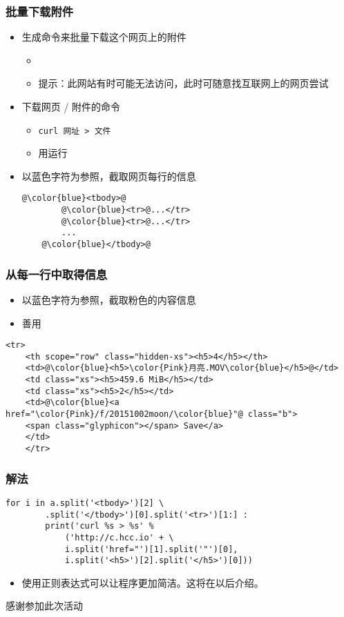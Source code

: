 \begin{frame} [fragile]
	\frametitle{批量下载附件}
	\begin{itemize}
	\item 生成命令来批量下载这个网页上的附件
		\begin{itemize}
		\item {}
		\item 提示：此网站有时可能无法访问，此时可随意找互联网上的网页尝试
		\end{itemize}
	\item 下载网页 / 附件的命令
		\begin{itemize}
		\item \texttt{curl 网址 > 文件}
		\item 用运行
		\end{itemize}
	\item 以{\color{blue}蓝色}字符为参照，截取网页每行的信息
	\begin{lstlisting}[style=pythonstyle, gobble=4, texcl, escapechar=@]
	@\color{blue}<tbody>@
		@\color{blue}<tr>@...</tr>
		@\color{blue}<tr>@...</tr>
		...
	@\color{blue}</tbody>@
	\end{lstlisting}
	\end{itemize}
\end{frame}

\begin{frame} [fragile]
	\frametitle{从每一行中取得信息}
	\begin{itemize}
	\item 以{\color{blue}蓝色}字符为参照，截取{\color{Pink}粉色}的内容信息
	\item 善用 
	\end{itemize}
	\begin{lstlisting}[basicstyle=\ttfamily, gobble=4, texcl, escapechar=@]
	<tr>
	<th scope="row" class="hidden-xs"><h5>4</h5></th>
	<td>@\color{blue}<h5>\color{Pink}月亮.MOV\color{blue}</h5>@</td>
	<td class="xs"><h5>459.6 MiB</h5></td>
	<td class="xs"><h5>2</h5></td>
	<td>@\color{blue}<a href="\color{Pink}/f/20151002moon/\color{blue}"@ class="b">
	<span class="glyphicon"></span> Save</a>
	</td>
	</tr>
	\end{lstlisting}
\end{frame}

\begin{frame} [fragile]
	\frametitle{解法}
	\begin{lstlisting}[style=pythonstyle, gobble=4, texcl, escapechar=@]
	for i in a.split('<tbody>')[2] \
		.split('</tbody>')[0].split('<tr>')[1:] :
		print('curl %s > %s' %
			('http://c.hcc.io' + \
			i.split('href="')[1].split('"')[0],
			i.split('<h5>')[2].split('</h5>')[0]))
	\end{lstlisting}
	\begin{itemize}
	\item 使用正则表达式可以让程序更加简洁。这将在以后介绍。
	\end{itemize}
\end{frame}

\PreLastFrame
\begin{frame}
	\centerline{\fontsize{32}{32}\selectfont 感谢参加此次活动}
\end{frame}

\newpage


